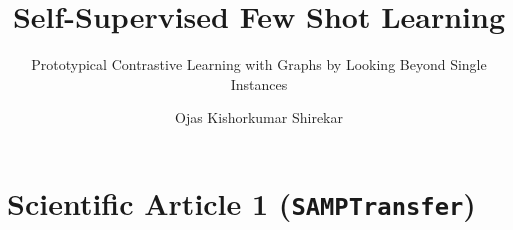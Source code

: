 \documentclass[whitelogo]{TUD-report2020}
\def\samptr{\texttt{SAMPTransfer}}
\begin{document}
\captionsetup{format=plain, font=small, labelfont=bf, justification=RaggedRight}
\frontmatter


\title[tudelft-white]{Self-Supervised Few Shot Learning}
\subtitle[tudelft-white]{Prototypical Contrastive Learning with Graphs by Looking Beyond Single Instances}
\author[tudelft-white]{Ojas Kishorkumar Shirekar}
\makecover[split]








\tableofcontents

\mainmatter



\listofchanges[title=Comments]



\chapter{Scientific Article 1 (\samptr)}\label{chap:samp-transfer-art}

\end{document}
